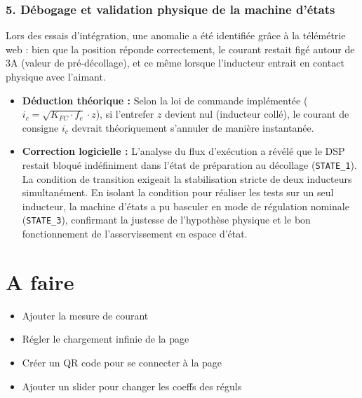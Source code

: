 \subsubsection*{5. Débogage et validation physique de la machine d'états}
Lors des essais d'intégration, une anomalie a été identifiée grâce à la télémétrie web : bien que la position réponde correctement, le courant restait figé autour de 3A (valeur de pré-décollage), et ce même lorsque l'inducteur entrait en contact physique avec l'aimant.
\begin{itemize}
  \item \textbf{Déduction théorique :} Selon la loi de commande implémentée ($i_c = \sqrt{K_{FC} \cdot f_c} \cdot z$), si l'entrefer $z$ devient nul (inducteur collé), le courant de consigne $i_c$ devrait théoriquement s'annuler de manière instantanée.
  \item \textbf{Correction logicielle :} L'analyse du flux d'exécution a révélé que le DSP restait bloqué indéfiniment dans l'état de préparation au décollage (\texttt{STATE\_1}). La condition de transition exigeait la stabilisation stricte de deux inducteurs simultanément. En isolant la condition pour réaliser les tests sur un seul inducteur, la machine d'états a pu basculer en mode de régulation nominale (\texttt{STATE\_3}), confirmant la justesse de l'hypothèse physique et le bon fonctionnement de l'asservissement en espace d'état.
\end{itemize}

\section{A faire}
\begin{itemize}
  \item Ajouter la mesure de courant
  \item Régler le chargement infinie de la page
  \item Créer un QR code pour se connecter à la page
  \item Ajouter un slider pour changer les coeffs des réguls
\end{itemize}
